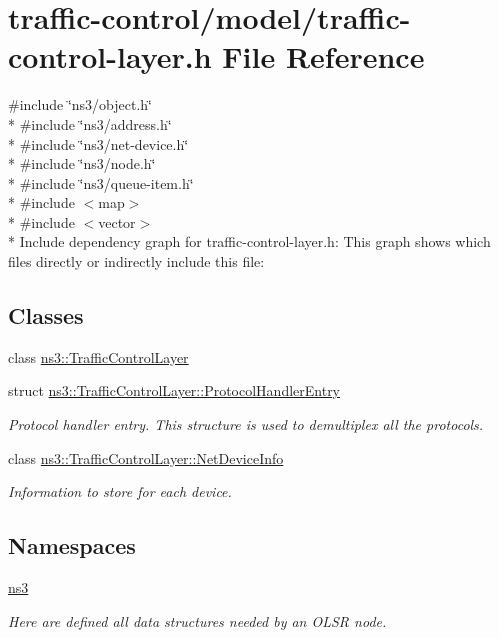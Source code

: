 \hypertarget{traffic-control-layer_8h}{}\section{traffic-\/control/model/traffic-\/control-\/layer.h File Reference}
\label{traffic-control-layer_8h}
{\ttfamily \#include \char`\"{}ns3/object.\+h\char`\"{}}\\*
{\ttfamily \#include \char`\"{}ns3/address.\+h\char`\"{}}\\*
{\ttfamily \#include \char`\"{}ns3/net-\/device.\+h\char`\"{}}\\*
{\ttfamily \#include \char`\"{}ns3/node.\+h\char`\"{}}\\*
{\ttfamily \#include \char`\"{}ns3/queue-\/item.\+h\char`\"{}}\\*
{\ttfamily \#include $<$map$>$}\\*
{\ttfamily \#include $<$vector$>$}\\*
Include dependency graph for traffic-\/control-\/layer.h\+:
This graph shows which files directly or indirectly include this file\+:
\subsection*{Classes}
\begin{DoxyCompactItemize}
\item 
class \hyperlink{classns3_1_1TrafficControlLayer}{ns3\+::\+Traffic\+Control\+Layer}
\item 
struct \hyperlink{structns3_1_1TrafficControlLayer_1_1ProtocolHandlerEntry}{ns3\+::\+Traffic\+Control\+Layer\+::\+Protocol\+Handler\+Entry}
\begin{DoxyCompactList}\small\item\em Protocol handler entry. This structure is used to demultiplex all the protocols. \end{DoxyCompactList}\item 
class \hyperlink{classns3_1_1TrafficControlLayer_1_1NetDeviceInfo}{ns3\+::\+Traffic\+Control\+Layer\+::\+Net\+Device\+Info}
\begin{DoxyCompactList}\small\item\em Information to store for each device. \end{DoxyCompactList}\end{DoxyCompactItemize}
\subsection*{Namespaces}
\begin{DoxyCompactItemize}
\item 
 \hyperlink{namespacens3}{ns3}
\begin{DoxyCompactList}\small\item\em Here are defined all data structures needed by an O\+L\+SR node. \end{DoxyCompactList}\end{DoxyCompactItemize}
